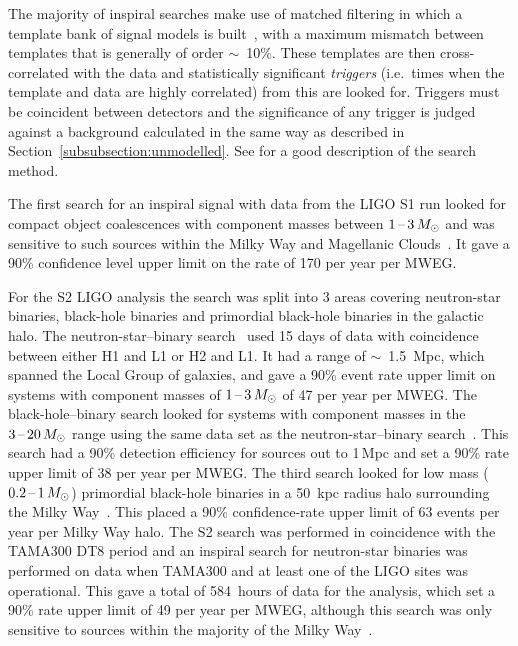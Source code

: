 \documentclass{article}
\begin{document}
The majority of inspiral searches make use of matched filtering in which a
template bank of signal models is built~\cite{Owen:1996, Owen:1999}, with a
maximum mismatch between templates that is generally of order $\sim$~10\%. These
templates are then cross-correlated with the data and statistically significant
\textit{triggers} (i.e.\ times when the template and data are highly correlated)
from this are looked for. Triggers must be coincident between detectors and the
significance of any trigger is judged against a background calculated in the
same way as described in Section~\ref{subsubsection:unmodelled}. See
\cite{Abbott:2005b} for a good description of the search method.

The first search for an inspiral signal with data from the LIGO S1 run looked
for compact object coalescences with component masses between $1\mbox{\,--\,}3\,M_{\odot}$
and was sensitive to such sources within the Milky Way and Magellanic
Clouds~\cite{Abbott:2004c}. It gave a 90\% confidence level upper
limit on the rate of 170 per year per MWEG.

For the S2 LIGO analysis the search was split into 3 areas covering neutron-star
binaries, black-hole binaries and primordial black-hole binaries in the galactic
halo. The neutron-star--binary search~\cite{Abbott:2005b} used 15 days of data
with coincidence between either H1 and L1 or H2 and L1. It had a range of
$\sim$~1.5~Mpc, which spanned the Local Group of galaxies, and gave a 90\% event
rate upper limit on systems with component masses of $1\mbox{\,--\,}3\,M_{\odot}$ of 47 per
year per MWEG. The black-hole--binary search looked for systems with component
masses in the $3\mbox{\,--\,}20\,M_{\odot}$ range using the same data set as the
neutron-star--binary search~\cite{Abbott:2006a}. This search had a 90\% detection
efficiency for sources out to 1\,Mpc and set a 90\% rate upper limit of 38 per
year per MWEG. The third search looked for low mass ($0.2\mbox{\,--\,}1\,M_{\odot}$)
primordial black-hole binaries in a 50~kpc radius halo surrounding the Milky
Way~\cite{Abbott:2005e}. This placed a 90\% confidence-rate upper limit of 63
events per year per Milky Way halo. The S2 search was performed in coincidence
with the TAMA300 DT8 period and an inspiral search for neutron-star binaries
was
performed on data when TAMA300 and at least one of the LIGO sites was
operational. This gave a total of 584~hours of data for the analysis, which set
a 90\% rate upper limit of 49 per year per MWEG, although this search was only
sensitive to sources within the majority of the Milky Way~\cite{Abbott:2006b}.
\end{document}
